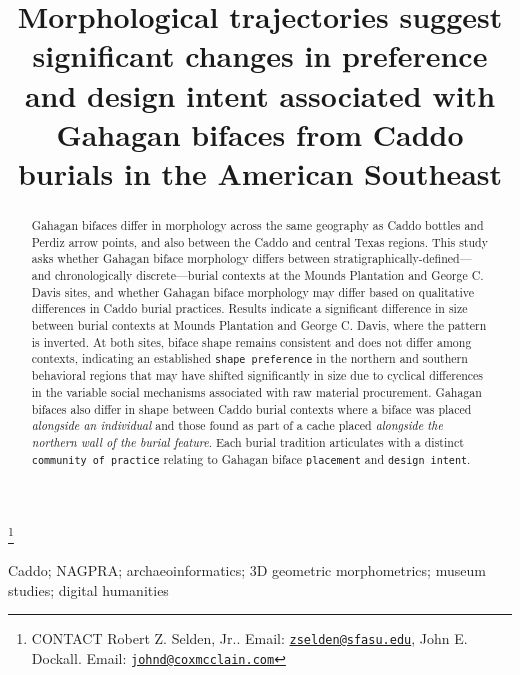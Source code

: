 \documentclass[]{interact}
\theoremstyle{plain}%
\theoremstyle{definition}
\theoremstyle{remark}
\begin{document}

\title{Morphological trajectories suggest significant changes in
preference and design intent associated with Gahagan bifaces from Caddo
burials in the American Southeast}


\author{
}

\thanks{CONTACT Robert Z. Selden,
Jr.. Email: \href{mailto:zselden@sfasu.edu}{\nolinkurl{zselden@sfasu.edu}}, John
E.
Dockall. Email: \href{mailto:johnd@coxmcclain.com}{\nolinkurl{johnd@coxmcclain.com}}}

\maketitle

\begin{abstract}
Gahagan bifaces differ in morphology across the same geography as Caddo
bottles and Perdiz arrow points, and also between the Caddo and central
Texas regions. This study asks whether Gahagan biface morphology differs
between stratigraphically-defined---and chronologically
discrete---burial contexts at the Mounds Plantation and George C. Davis
sites, and whether Gahagan biface morphology may differ based on
qualitative differences in Caddo burial practices. Results indicate a
significant difference in size between burial contexts at Mounds
Plantation and George C. Davis, where the pattern is inverted. At both
sites, biface shape remains consistent and does not differ among
contexts, indicating an established \texttt{shape\ preference} in the
northern and southern behavioral regions that may have shifted
significantly in size due to cyclical differences in the variable social
mechanisms associated with raw material procurement. Gahagan bifaces
also differ in shape between Caddo burial contexts where a biface was
placed \emph{alongside an individual} and those found as part of a cache
placed \emph{alongside the northern wall of the burial feature}. Each
burial tradition articulates with a distinct
\texttt{community\ of\ practice} relating to Gahagan biface
\texttt{placement} and \texttt{design\ intent}.
\end{abstract}

\begin{keywords}
Caddo; NAGPRA; archaeoinformatics; 3D geometric morphometrics; museum
studies; digital humanities
\end{keywords}
\end{document}
